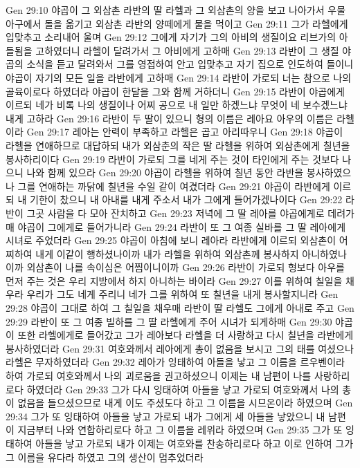 Gen 29:10  야곱이 그 외삼촌 라반의 딸 라헬과 그 외삼촌의 양을 보고 나아가서 우물 아구에서 돌을 옮기고 외삼촌 라반의 양떼에게 물을 먹이고
Gen 29:11  그가 라헬에게 입맞추고 소리내어 울며
Gen 29:12  그에게 자기가 그의 아비의 생질이요 리브가의 아들됨을 고하였더니 라헬이 달려가서 그 아비에게 고하매
Gen 29:13  라반이 그 생질 야곱의 소식을 듣고 달려와서 그를 영접하여 안고 입맞추고 자기 집으로 인도하여 들이니 야곱이 자기의 모든 일을 라반에게 고하매
Gen 29:14  라반이 가로되 너는 참으로 나의 골육이로다 하였더라 야곱이 한달을 그와 함께 거하더니
Gen 29:15  라반이 야곱에게 이르되 네가 비록 나의 생질이나 어찌 공으로 내 일만 하겠느냐 무엇이 네 보수겠느냐 내게 고하라
Gen 29:16  라반이 두 딸이 있으니 형의 이름은 레아요 아우의 이름은 라헬이라
Gen 29:17  레아는 안력이 부족하고 라헬은 곱고 아리따우니
Gen 29:18  야곱이 라헬을 연애하므로 대답하되 내가 외삼춘의 작은 딸 라헬을 위하여 외삼촌에게 칠년을 봉사하리이다
Gen 29:19  라반이 가로되 그를 네게 주는 것이 타인에게 주는 것보다 나으니 나와 함께 있으라
Gen 29:20  야곱이 라헬을 위하여 칠년 동안 라반을 봉사하였으나 그를 연애하는 까닭에 칠년을 수일 같이 여겼더라
Gen 29:21  야곱이 라반에게 이르되 내 기한이 찼으니 내 아내를 내게 주소서 내가 그에게 들어가겠나이다
Gen 29:22  라반이 그곳 사람을 다 모아 잔치하고
Gen 29:23  저녁에 그 딸 레아를 야곱에게로 데려가매 야곱이 그에게로 들어가니라
Gen 29:24  라반이 또 그 여종 실바를 그 딸 레아에게 시녀로 주었더라
Gen 29:25  야곱이 아침에 보니 레아라 라반에게 이르되 외삼촌이 어찌하여 내게 이같이 행하셨나이까 내가 라헬을 위하여 외삼촌께 봉사하지 아니하였나이까 외삼촌이 나를 속이심은 어찜이니이까
Gen 29:26  라반이 가로되 형보다 아우를 먼저 주는 것은 우리 지방에서 하지 아니하는 바이라
Gen 29:27  이를 위하여 칠일을 채우라 우리가 그도 네게 주리니 네가 그를 위하여 또 칠년을 내게 봉사할지니라
Gen 29:28  야곱이 그대로 하여 그 칠일을 채우매 라반이 딸 라헬도 그에게 아내로 주고
Gen 29:29  라반이 또 그 여종 빌하를 그 딸 라헬에게 주어 시녀가 되게하매
Gen 29:30  야곱이 또한 라헬에게로 들어갔고 그가 레아보다 라헬을 더 사랑하고 다시 칠년을 라반에게 봉사하였더라
Gen 29:31  여호와께서 레아에게 총이 없음을 보시고 그의 태를 여셨으나 라헬은 무자하였더라
Gen 29:32  레아가 잉태하여 아들을 낳고 그 이름을 르우벤이라 하여 가로되 여호와께서 나의 괴로움을 권고하셨으니 이제는 내 남편이 나를 사랑하리로다 하였더라
Gen 29:33  그가 다시 잉태하여 아들을 낳고 가로되 여호와께서 나의 총이 없음을 들으셨으므로 내게 이도 주셨도다 하고 그 이름을 시므온이라 하였으며
Gen 29:34  그가 또 잉태하여 아들을 낳고 가로되 내가 그에게 세 아들을 낳았으니 내 남편이 지금부터 나와 연합하리로다 하고 그 이름을 레위라 하였으며
Gen 29:35  그가 또 잉태하여 아들을 낳고 가로되 내가 이제는 여호와를 찬송하리로다 하고 이로 인하여 그가 그 이름을 유다라 하였고 그의 생산이 멈추었더라
